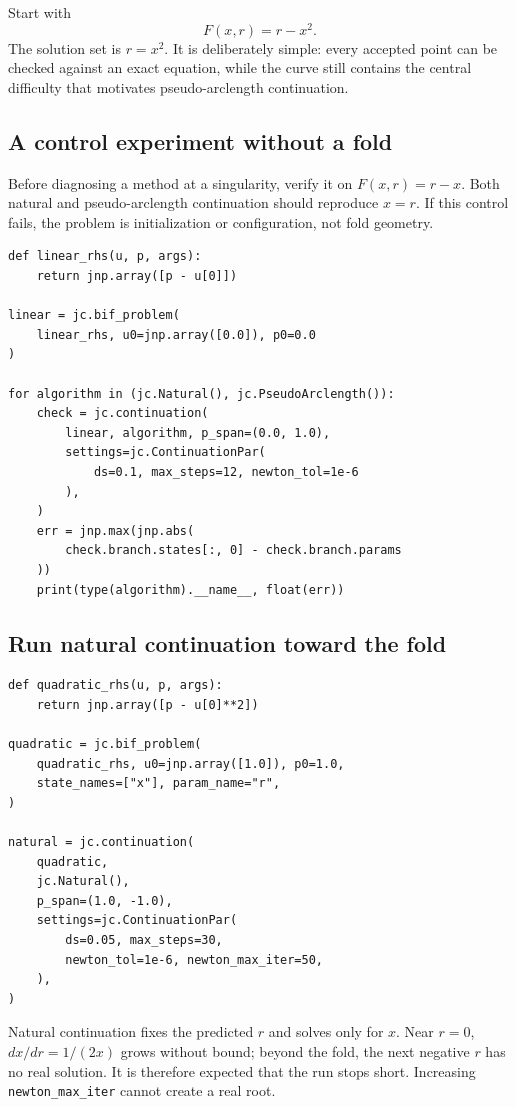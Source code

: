 \documentclass[11pt,oneside]{book}
\begin{document}
Start with
\[
  F(x,r)=r-x^2.
\]
The solution set is $r=x^2$. It is deliberately simple: every accepted point
can be checked against an exact equation, while the curve still contains the
central difficulty that motivates pseudo-arclength continuation.

\subsection{A control experiment without a fold}

Before diagnosing a method at a singularity, verify it on
$F(x,r)=r-x$. Both natural and pseudo-arclength continuation should reproduce
$x=r$. If this control fails, the problem is initialization or configuration,
not fold geometry.

\begin{lstlisting}
def linear_rhs(u, p, args):
    return jnp.array([p - u[0]])

linear = jc.bif_problem(
    linear_rhs, u0=jnp.array([0.0]), p0=0.0
)

for algorithm in (jc.Natural(), jc.PseudoArclength()):
    check = jc.continuation(
        linear, algorithm, p_span=(0.0, 1.0),
        settings=jc.ContinuationPar(
            ds=0.1, max_steps=12, newton_tol=1e-6
        ),
    )
    err = jnp.max(jnp.abs(
        check.branch.states[:, 0] - check.branch.params
    ))
    print(type(algorithm).__name__, float(err))
\end{lstlisting}

\subsection{Run natural continuation toward the fold}

\begin{lstlisting}
def quadratic_rhs(u, p, args):
    return jnp.array([p - u[0]**2])

quadratic = jc.bif_problem(
    quadratic_rhs, u0=jnp.array([1.0]), p0=1.0,
    state_names=["x"], param_name="r",
)

natural = jc.continuation(
    quadratic,
    jc.Natural(),
    p_span=(1.0, -1.0),
    settings=jc.ContinuationPar(
        ds=0.05, max_steps=30,
        newton_tol=1e-6, newton_max_iter=50,
    ),
)
\end{lstlisting}

Natural continuation fixes the predicted $r$ and solves only for $x$. Near
$r=0$, $dx/dr=1/(2x)$ grows without bound; beyond the fold, the next negative
$r$ has no real solution. It is therefore expected that the run stops short.
Increasing \texttt{newton\_max\_iter} cannot create a real root.
\end{document}
